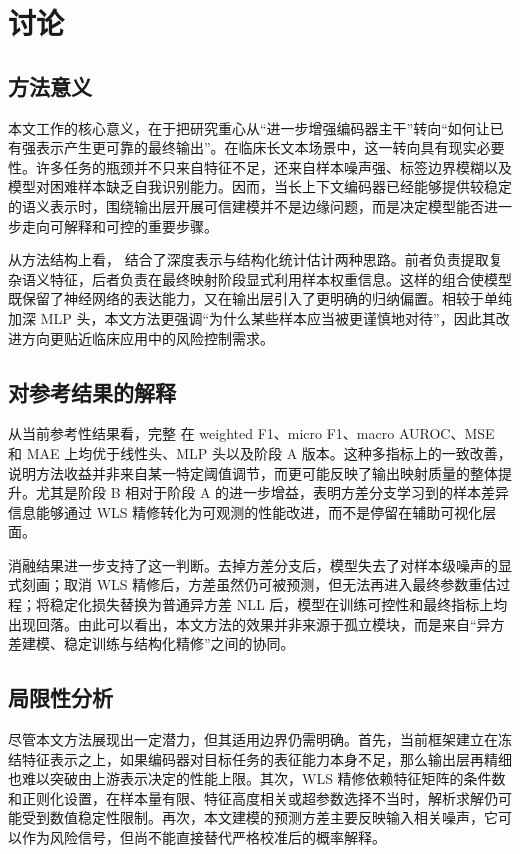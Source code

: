 \section{讨论}
\subsection{方法意义}
本文工作的核心意义，在于把研究重心从“进一步增强编码器主干”转向“如何让已有强表示产生更可靠的最终输出”。在临床长文本场景中，这一转向具有现实必要性。许多任务的瓶颈并不只来自特征不足，还来自样本噪声强、标签边界模糊以及模型对困难样本缺乏自我识别能力。因而，当长上下文编码器已经能够提供较稳定的语义表示时，围绕输出层开展可信建模并不是边缘问题，而是决定模型能否进一步走向可解释和可控的重要步骤。

从方法结构上看，\method{} 结合了深度表示与结构化统计估计两种思路。前者负责提取复杂语义特征，后者负责在最终映射阶段显式利用样本权重信息。这样的组合使模型既保留了神经网络的表达能力，又在输出层引入了更明确的归纳偏置。相较于单纯加深 MLP 头，本文方法更强调“为什么某些样本应当被更谨慎地对待”，因此其改进方向更贴近临床应用中的风险控制需求。

\subsection{对参考结果的解释}
从当前参考性结果看，完整 \method{} 在 weighted F1、micro F1、macro AUROC、MSE 和 MAE 上均优于线性头、MLP 头以及阶段 A 版本。这种多指标上的一致改善，说明方法收益并非来自某一特定阈值调节，而更可能反映了输出映射质量的整体提升。尤其是阶段 B 相对于阶段 A 的进一步增益，表明方差分支学习到的样本差异信息能够通过 WLS 精修转化为可观测的性能改进，而不是停留在辅助可视化层面。

消融结果进一步支持了这一判断。去掉方差分支后，模型失去了对样本级噪声的显式刻画；取消 WLS 精修后，方差虽然仍可被预测，但无法再进入最终参数重估过程；将稳定化损失替换为普通异方差 NLL 后，模型在训练可控性和最终指标上均出现回落。由此可以看出，本文方法的效果并非来源于孤立模块，而是来自“异方差建模、稳定训练与结构化精修”之间的协同。

\subsection{局限性分析}
尽管本文方法展现出一定潜力，但其适用边界仍需明确。首先，当前框架建立在冻结特征表示之上，如果编码器对目标任务的表征能力本身不足，那么输出层再精细也难以突破由上游表示决定的性能上限。其次，WLS 精修依赖特征矩阵的条件数和正则化设置，在样本量有限、特征高度相关或超参数选择不当时，解析求解仍可能受到数值稳定性限制。再次，本文建模的预测方差主要反映输入相关噪声，它可以作为风险信号，但尚不能直接替代严格校准后的概率解释。

